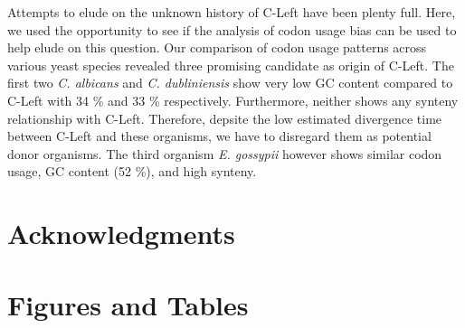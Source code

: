 \documentclass[12pt,draft]{article}
\begin{document}
Attempts to elude on the unknown history of C-Left have been plenty full.
Here, we used the opportunity to see if the analysis of codon usage bias can be used to help elude on this question.
Our comparison of codon usage patterns across various yeast species revealed three promising candidate as origin of C-Left.
The first two \textit{C. albicans} and \textit{C. dubliniensis} show very low GC content compared to C-Left with 34 \% and 33 \% respectively. 
Furthermore, neither shows any synteny relationship with C-Left.
Therefore, depsite the low estimated divergence time between C-Left and these organisms, we have to disregard them as potential donor organisms. 
The third organism \textit{E. gossypii} however shows similar codon usage, GC content (52 \%), and high synteny.  

\section{Acknowledgments}






\section{Figures and Tables}
\end{document}
